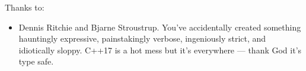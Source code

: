 \noindent
Thanks to:
\begin{itemize}
    \item Dennis Ritchie and Bjarne Stroustrup.  You've accidentally created something hauntingly expressive, painstakingly verbose, ingeniously strict, and idiotically sloppy.  C++17 is a hot mess but it's everywhere --- thank God it's type safe.  
\end{itemize}
